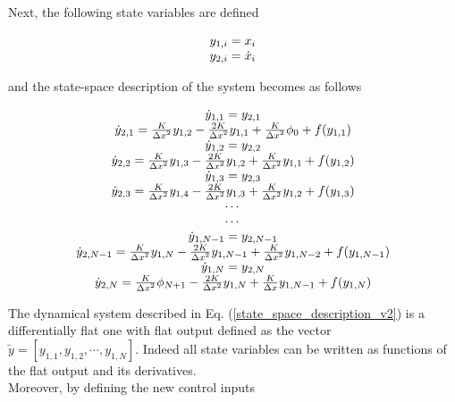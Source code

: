 \documentclass[journal]{IEEEtran}
\begin{document}
\noindent Next, the following state variables are defined

\begin{equation} \label{new_state_variables}
\begin{tabular}{c}
$y_{1,i}=x_i$ \\
$y_{2,i}=\dot{x}_i$
\end{tabular}
\end{equation}

\noindent and the state-space description of the system becomes as follows

\begin{equation} \label{state_space_description_v2}
\begin{tabular}{c}
$\dot{y}_{1,1}=y_{2,1}$ \\
$\dot{y}_{2,1}={K \over {{\Delta}x}^2}y_{1,2}-{{2K} \over {{\Delta}x}^2}y_{1,1}+{K \over {{\Delta}x}^2}\phi_0+f(y_{1,1})$ \\
$\dot{y}_{1,2}=y_{2,2}$ \\
$\dot{y}_{2,2}={K \over {{\Delta}x}^2}y_{1,3}-{{2K} \over {{\Delta}x}^2}y_{1,2}+{K \over {{\Delta}x}^2}y_{1,1}+f(y_{1,2})$ \\
$\dot{y}_{1,3}=y_{2,3}$ \\
$\dot{y}_{2,3}={K \over {{\Delta}x}^2}y_{1,4}-{{2K} \over {{\Delta}x}^2}y_{1,3}+{K \over {{\Delta}x}^2}y_{1,2}+f(y_{1,3})$ \\
$\cdots$ \\
$\cdots$ \\
$\dot{y}_{1,N-1}=y_{2,N-1}$ \\
$\dot{y}_{2,N-1}={K \over {{\Delta}x}^2}y_{1,N}-{{2K} \over {{\Delta}x}^2}y_{1,N-1}+{K \over {{\Delta}x}^2}y_{1,N-2}+f(y_{1,N-1})$ \\
$\dot{y}_{1,N}=y_{2,N}$ \\
$\dot{y}_{2,N}={K \over {{\Delta}x}^2}\phi_{N+1}-{{2K} \over {{\Delta}x^2}}y_{1,N}+{K \over {\Delta}x}y_{1,N-1}+f(y_{1,N})$
\end{tabular}
\end{equation}

\noindent The dynamical system described in Eq. (\ref{state_space_description_v2}) is a differentially flat one with flat output defined as the vector $\tilde{y}=[y_{1,1},y_{1,2},\cdots,y_{1,N}]$. Indeed all state variables can be written as functions of the flat output and its derivatives. \\

\noindent Moreover, by defining the new control inputs
\end{document}
